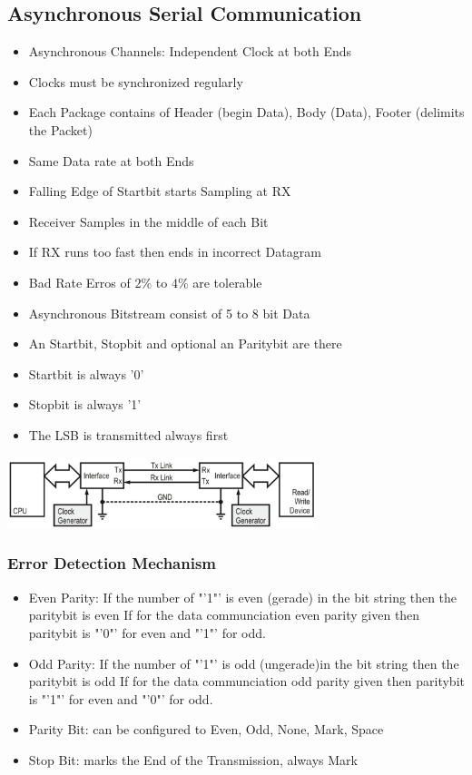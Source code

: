 \clearpage
\pagebreak
\subsection{Asynchronous Serial Communication }
\begin{minipage}{12cm}
	\begin{itemize}
		\item Asynchronous Channels: Independent Clock at both Ends	
		\item Clocks must be synchronized regularly
		\item Each Package contains of Header (begin Data), Body (Data), Footer (delimits the Packet)
		\item Same Data rate at both Ends
		\item Falling Edge of Startbit starts Sampling at RX
		\item Receiver Samples in the middle of each Bit
		\item If RX runs too fast then ends in incorrect Datagram
		\item Bad Rate Erros of $2\%$ to $4\%$ are tolerable
		\item Asynchronous Bitstream consist of 5 to 8 bit Data
		\item An Startbit, Stopbit and optional an Paritybit are there
		\item Startbit is always '0'
		\item Stopbit is always '1'
		\item The LSB is transmitted always first
	\end{itemize}
\end{minipage}
\begin{minipage}{7cm}
    \vspace{0.6cm}
	\hspace{-2cm}\includegraphics[width=9cm]{images/asyn}
\end{minipage}

\subsubsection{Error Detection Mechanism}
\begin{itemize}
	\item Even Parity: If the number of "'1"' is even (gerade) in the bit string then the paritybit is even \newline If for the data communciation even parity given then paritybit is "'0"' for even and "'1"' for odd. 
	\item Odd Parity: If the number of "'1"' is odd (ungerade)in the bit string then the paritybit is odd \newline If for the data communciation odd parity given then paritybit is "'1"' for even and "'0"' for odd.
	\item Parity Bit: can be configured to Even, Odd, None, Mark, Space
	\item Stop Bit: marks the End of the Transmission, always Mark
\end{itemize}
